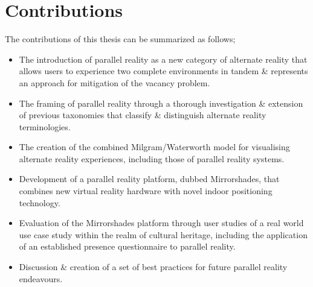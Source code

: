 
\section{Contributions}

The contributions of this thesis can be summarized as follows;

\begin{itemize}
	\item The introduction of parallel reality as a new category of alternate reality that allows users to experience two complete environments in tandem \& represents an approach for mitigation of the vacancy problem.
	\item The framing of parallel reality through a thorough investigation \& extension of previous taxonomies that classify \& distinguish alternate reality terminologies.
	\item The creation of the combined Milgram/Waterworth model for visualising alternate reality experiences, including those of parallel reality systems.
	\item Development of a parallel reality platform, dubbed Mirrorshades, that combines new virtual reality hardware with novel indoor positioning technology.
	\item Evaluation of the Mirrorshades platform through user studies of a real world use case study within the realm of cultural heritage, including the application of an established presence questionnaire to parallel reality.
	\item Discussion \& creation of a set of best practices for future parallel reality endeavours.
\end{itemize}





